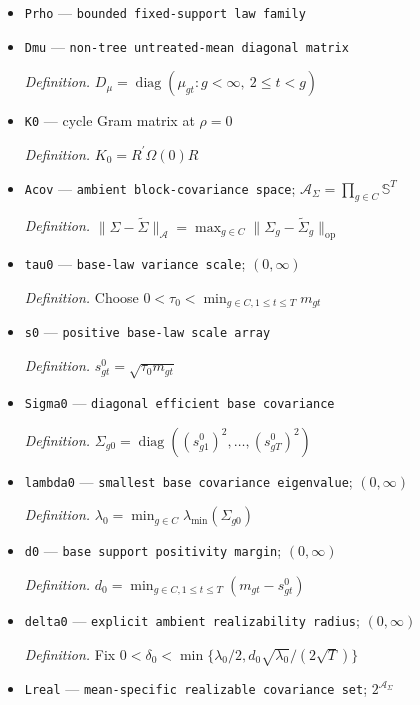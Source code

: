 \documentclass{article}
\begin{document}
\begin{itemize}
  \item \texttt{Prho} --- \texttt{bounded fixed-\allowbreak{}support law family}
  \item \texttt{Dmu} --- \texttt{non-\allowbreak{}tree untreated-\allowbreak{}mean diagonal matrix}
  \par\smallskip\noindent\emph{Definition.} \(D_{\mu}=\operatorname{diag}(\mu_{gt}:g<\infty,\ 2\le t<g)\)
  \item \texttt{K0} --- cycle Gram matrix at \(\rho=0\)
  \par\smallskip\noindent\emph{Definition.} \(K_0=R^{\prime}\Omega(0)R\)
  \item \texttt{Acov} --- \texttt{ambient block-\allowbreak{}covariance space}; \(\mathcal A_{\Sigma}=\prod_{g\in C}\mathbb S^T\)
  \par\smallskip\noindent\emph{Definition.} \(\|\Sigma-\widetilde\Sigma\|_{\mathcal A}=\max_{g\in C}\|\Sigma_g-\widetilde\Sigma_g\|_{\mathrm{op}}\)
  \item \texttt{tau0} --- \texttt{base-\allowbreak{}law variance scale}; \((0,\infty)\)
  \par\smallskip\noindent\emph{Definition.} Choose \(0<\tau_0<\min_{g\in C,1\le t\le T}m_{gt}\)
  \item \texttt{s0} --- \texttt{positive base-\allowbreak{}law scale array}
  \par\smallskip\noindent\emph{Definition.} \(s^0_{gt}=\sqrt{\tau_0m_{gt}}\)
  \item \texttt{Sigma0} --- \texttt{diagonal efficient base covariance}
  \par\smallskip\noindent\emph{Definition.} \(\Sigma_{g0}=\operatorname{diag}((s^0_{g1})^2,\ldots,(s^0_{gT})^2)\)
  \item \texttt{lambda0} --- \texttt{smallest base covariance eigenvalue}; \((0,\infty)\)
  \par\smallskip\noindent\emph{Definition.} \(\lambda_0=\min_{g\in C}\lambda_{\min}(\Sigma_{g0})\)
  \item \texttt{d0} --- \texttt{base support positivity margin}; \((0,\infty)\)
  \par\smallskip\noindent\emph{Definition.} \(d_0=\min_{g\in C,1\le t\le T}(m_{gt}-s^0_{gt})\)
  \item \texttt{delta0} --- \texttt{explicit ambient realizability radius}; \((0,\infty)\)
  \par\smallskip\noindent\emph{Definition.} Fix \(0<\delta_0<\min\{\lambda_0/2,d_0\sqrt{\lambda_0}/(2\sqrt T)\}\)
  \item \texttt{Lreal} --- \texttt{mean-\allowbreak{}specific realizable covariance set}; \(2^{\mathcal A_{\Sigma}}\)

\end{itemize}
\end{document}
